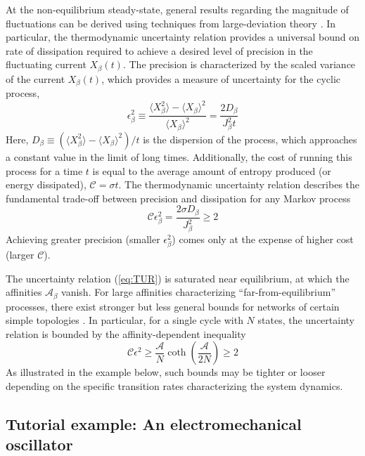 \begin{appendices}
At the non-equilibrium steady-state, general results regarding the magnitude of fluctuations can be derived using techniques from large-deviation theory \cite{Touchette2009}. In particular, the thermodynamic uncertainty relation \cite{Barato2015,Gingrich2016} provides a universal bound on rate of dissipation required to achieve a desired level of precision in the fluctuating current $X_{\beta}(t)$. The precision is characterized by the scaled variance of the current $X_{\beta}(t)$, which provides a measure of uncertainty for the cyclic process,
\begin{equation}
    \epsilon^2_{\beta} \equiv \frac{\langle X_{\beta}^2 \rangle -\langle X_{\beta} \rangle^2 }{\langle X_{\beta} \rangle^2} = \frac{2 D_{\beta}}{J^2_{\beta} t}
\end{equation}
Here, $D_{\beta}\equiv ( \langle X_{\beta}^2 \rangle -\langle X_{\beta} \rangle^2) / t$ is the dispersion of the process, which approaches a constant value in the limit of long times.  Additionally, the cost of running this process for a time $t$ is equal to the average amount of entropy produced (or energy dissipated), $\mathcal{C} = \sigma t$. The thermodynamic uncertainty relation describes the fundamental trade-off between precision and dissipation for any Markov process
\begin{equation}
     \mathcal{C}\epsilon^2_{\beta} = \frac{2\sigma D_{\beta}}{J_{\beta}^2} \geq 2 \label{eq:TUR}
\end{equation}
Achieving greater precision (smaller $\epsilon_{\beta}^2$) comes only at the expense of higher cost (larger $\mathcal{C}$).  

The uncertainty relation (\ref{eq:TUR}) is saturated near equilibrium, at which the affinities $\mathcal{A}_{\beta}$ vanish. For large affinities characterizing ``far-from-equilibrium'' processes, there exist stronger but less general bounds for networks of certain simple topologies \cite{Pietzonka2016b}.  In particular, for a single cycle with $N$ states, the uncertainty relation is bounded by the affinity-dependent inequality  
\begin{equation}
    \mathcal{C}\epsilon^2 \geq \frac{\mathcal{A}}{N}\coth\left(\frac{\mathcal{A}}{2N}\right) \geq 2 \label{eq:unicycle}
\end{equation}
As illustrated in the example below, such bounds may be tighter or looser depending on the specific transition rates characterizing the system dynamics. 

\subsection{Tutorial example: An electromechanical oscillator}


\end{appendices}
